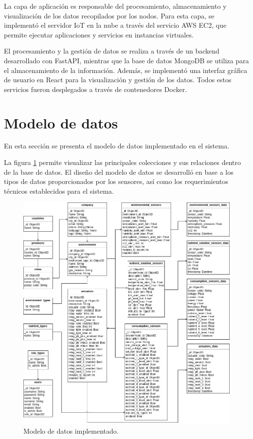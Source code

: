 La capa de aplicación es responsable del procesamiento, almacenamiento y
visualización de los datos recopilados por los nodos. Para esta capa, se
implementó el servidor IoT en la nube a través del servicio AWS EC2, que
permite ejecutar aplicaciones y servicios en instancias virtuales.

El procesamiento y la gestión de datos se realiza a través de un backend
desarrollado con FastAPI, mientras que la base de datos MongoDB se utiliza para
el almacenamiento de la información. Además, se implementó una interfaz gráfica
de usuario en React para la visualización y gestión de los datos. Todos estos
servicios fueron desplegados a través de contenedores Docker.

\section{Modelo de datos}

En esta sección se presenta el modelo de datos implementado en el sistema.

La figura \ref{fig:modelo de datos} permite visualizar las principales
colecciones y sus relaciones dentro de la base de datos. El diseño del modelo
de datos se desarrolló en base a los tipos de datos proporcionados por los
sensores, así como los requerimientos técnicos establecidos para el sistema.

\begin{figure}[H]
    \centering
    \includegraphics[width=.99\textwidth]{./Images/15.png}
    \caption{Modelo de datos implementado.}
    \label{fig:modelo de datos}
\end{figure}

